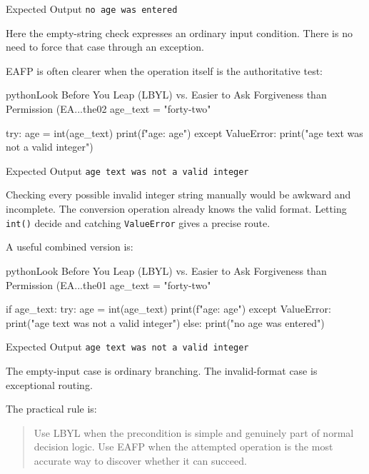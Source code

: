 \documentclass[a4paper,twoside]{report}
\begin{document}
\begin{iobox}{Expected Output}
\texttt{no age was entered} \\
\end{iobox}


Here the empty-string check expresses an ordinary input condition. There is no need to force that case through an exception.

EAFP is often clearer when the operation itself is the authoritative test:

\begin{codebox}[]{python}{Look Before You Leap (LBYL) vs. Easier to Ask Forgiveness than Permission (EA...}{the02}
age_text = "forty-two"

try:
    age = int(age_text)
    print(f"age: {age}")
except ValueError:
    print("age text was not a valid integer")
\end{codebox}


\begin{iobox}{Expected Output}
\texttt{age text was not a valid integer} \\
\end{iobox}


Checking every possible invalid integer string manually would be awkward and incomplete. The conversion operation already knows the valid format. Letting \texttt{int()} decide and catching \texttt{ValueError} gives a precise route.

A useful combined version is:

\begin{codebox}[]{python}{Look Before You Leap (LBYL) vs. Easier to Ask Forgiveness than Permission (EA...}{the01}
age_text = "forty-two"

if age_text:
    try:
        age = int(age_text)
        print(f"age: {age}")
    except ValueError:
        print("age text was not a valid integer")
else:
    print("no age was entered")
\end{codebox}


\begin{iobox}{Expected Output}
\texttt{age text was not a valid integer} \\
\end{iobox}


The empty-input case is ordinary branching. The invalid-format case is exceptional routing.

The practical rule is:

\begin{quote}
Use LBYL when the precondition is simple and genuinely part of normal decision logic. Use EAFP when the attempted operation is the most accurate way to discover whether it can succeed.
\end{quote}
\end{document}
